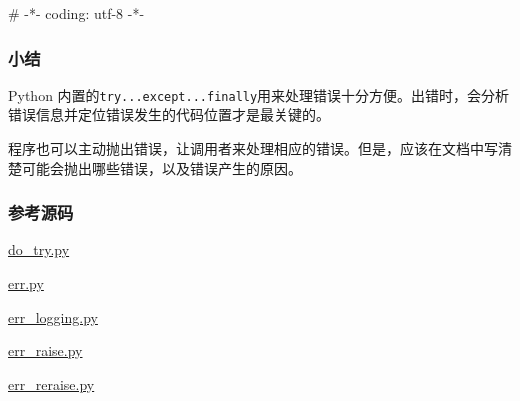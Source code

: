 \begin{pythoncode}
# -*- coding: utf-8 -*-
\end{pythoncode}

\hypertarget{ux5c0fux7ed3}{%
\subsubsection{小结}\label{ux5c0fux7ed3}}

Python
内置的\texttt{try...except...finally}用来处理错误十分方便。出错时，会分析错误信息并定位错误发生的代码位置才是最关键的。

程序也可以主动抛出错误，让调用者来处理相应的错误。但是，应该在文档中写清楚可能会抛出哪些错误，以及错误产生的原因。

\hypertarget{ux53c2ux8003ux6e90ux7801}{%
\subsubsection{参考源码}\label{ux53c2ux8003ux6e90ux7801}}

\href{https://github.com/michaelliao/learn-python3/blob/master/samples/debug/do_try.py}{do\_try.py}

\href{https://github.com/michaelliao/learn-python3/blob/master/samples/debug/err.py}{err.py}

\href{https://github.com/michaelliao/learn-python3/blob/master/samples/debug/err_logging.py}{err\_logging.py}

\href{https://github.com/michaelliao/learn-python3/blob/master/samples/debug/err_raise.py}{err\_raise.py}

\href{https://github.com/michaelliao/learn-python3/blob/master/samples/debug/err_reraise.py}{err\_reraise.py}

